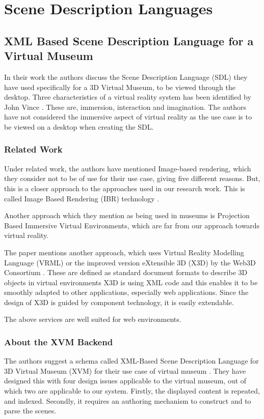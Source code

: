 \section{Scene Description Languages}

\subsection{XML Based Scene Description Language for a Virtual Museum}
In their work \cite{50} the authors discuss the Scene Description Language (SDL) they have used specifically for a 3D Virtual Museum, to be viewed through the desktop.
Three characteristics of a virtual reality system has been identified by John Vince \cite{51}. These are, immersion, interaction and imagination. The authors have not considered the immersive aspect of virtual reality as the use case is to be viewed on a desktop when creating the SDL.

\subsubsection{Related Work}
Under related work, the authors have mentioned Image-based rendering, which they consider not to be of use for their use case, giving five different reasons. But, this is a closer approach to the approaches used in our research work. This is called Image Based Rendering (IBR) technology \cite{52}.

Another approach which they mention as being used in museums is Projection Based Immersive Virtual Environments, which are far from our approach towards virtual reality.

The paper mentions another approach, which uses Virtual Reality Modelling Language (VRML) \cite{53} or the improved version eXtensible 3D (X3D) by the Web3D Consortium \cite{54}. These are defined as standard document formats to describe 3D objects in virtual environments X3D is using XML code and this enables it to be smoothly adapted to other applications, especially web applications. Since the design of X3D is guided by component technology, it is easily extendable.

The above services are well suited for web environments.

\subsubsection{About the XVM Backend}
The authors suggest a schema called XML-Based Scene Description Language for 3D Virtual Museum (XVM) for their use case of virtual museum \cite{50}. They have designed this with four design issues applicable to the virtual museum, out of which two are applicable to our system. Firstly, the displayed content is repeated, and indexed. Secondly, it requires an authoring mechanism to construct and to parse the scenes.

